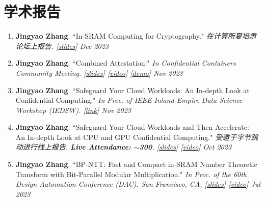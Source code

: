 \documentclass{resume}
\begin{document}
\section{学术报告}
\begin{enumerate}[label=\arabic*., itemsep=1pt, topsep=3pt]
    \item \textbf{Jingyao Zhang}. ``In-SRAM Computing for Cryptography." \textit{在计算所夏培肃论坛上报告. \emph{[\href{https://jingyao-zhang.github.io/slides/XiaPeisu.pdf}{slides}]}
    \hfill Dec 2023} \vspace{-2pt}
    
    \item \textbf{Jingyao Zhang}. ``Combined Attestation." \textit{In Confidential Containers Community Meeting. \emph{[\href{https://docs.google.com/presentation/d/1EbxBZL8DJf4skoyJklNx00zee0HalzV3Y9R76WWISQE/edit?usp=sharing}{slides}]
    [\href{https://zoom.us/rec/share/7yI2fIOceuSYvAtdZPwnzj6PYlGYJ3ABvOX5X8voL3tFHg6KREivf_V9Qp0ANTRI.-PtnE-Fj4pb8lN1Z}{video}]
    [\href{https://www.youtube.com/watch?v=PUM6HVjNAm8}{demo}]}
    \hfill Nov 2023} \vspace{-2pt}
    
    \item \textbf{Jingyao Zhang}. ``Safeguard Your Cloud Workloads: An In-depth Look at Confidential Computing." \textit{In Proc. of IEEE Inland Empire Data Science Workshop (IEDSW). \emph{[\href{https://sites.google.com/ucr.edu/ieee-inlandempire-dsw}{link}]}
    \hfill Nov 2023} \vspace{-2pt}
    
    \item \textbf{Jingyao Zhang}. ``Safeguard Your Cloud Workloads and Then Accelerate: An In-depth Look at CPU and GPU Confidential Computing." \textit{受邀于字节跳动进行线上报告. \textbf{Live Attendance: $\sim$300}. \emph{[\href{https://jingyao-zhang.github.io/slides/ByteDance-Tech-Talk-Slides.pdf}{slides}] [\href{https://bytedance.feishu.cn/minutes/obcn35p3vg153yhg211a9jl8?from=auth_notice}{video}]}
    \hfill Oct 2023} \vspace{-2pt}

    \item \textbf{Jingyao Zhang}. ``BP-NTT: Fast and Compact in-SRAM Number Theoretic Transform with Bit-Parallel Modular Multiplication." \textit{In Proc. of the 60th Design Automation Conference (DAC). San Francisco, CA. 
    \emph{[\href{https://jingyao-zhang.github.io/slides/DAC-2023-Slides.pdf}{slides}]
    [\href{https://www.youtube.com/watch?v=iCul63P_v2E}{video}]}
    \hfill Jul 2023} \vspace{-2pt}


\end{enumerate}
\end{document}
